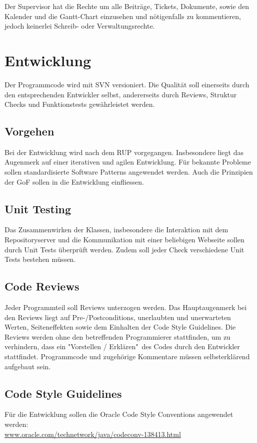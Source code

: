Der Supervisor hat die Rechte um alle Beiträge, Tickets, Dokumente, sowie den Kalender und die Gantt-Chart einzusehen und nötigenfalls zu kommentieren, jedoch keinerlei Schreib- oder Verwaltungsrechte.

\section{Entwicklung}
Der Programmcode wird mit SVN versioniert. Die Qualität soll einerseits durch den entsprechenden Entwickler selbst, andererseits durch Reviews, Struktur Checks und Funktionstests gewährleistet werden.

\subsection{Vorgehen}
Bei der Entwicklung wird nach dem RUP vorgegangen. Insbesondere liegt das Augenmerk auf einer iterativen und agilen Entwicklung. Für bekannte Probleme sollen standardisierte Software Patterns angewendet werden. Auch die Prinzipien der GoF sollen in die Entwicklung einfliessen.

\subsection{Unit Testing}
Das Zusammenwirken der Klassen, insbesondere die Interaktion mit dem Repositoryserver und die Kommunikation mit einer beliebigen Webseite sollen durch Unit Tests überprüft werden. Zudem soll jeder Check verschiedene Unit Tests bestehen müssen.

\subsection{Code Reviews}
Jeder Programmteil soll Reviews unterzogen werden. Das Hauptaugenmerk bei den Reviews liegt auf Pre-/Postconditions, unerlaubten und unerwarteten Werten, Seiteneffekten sowie dem Einhalten der Code Style Guidelines.
Die Reviews werden ohne den betreffenden Programmierer stattfinden, um zu verhindern, dass ein "Vorstellen / Erklären"\ des Codes durch den Entwickler stattfindet. Programmcode und zugehörige Kommentare müssen selbsterklärend aufgebaut sein.

\subsection{Code Style Guidelines}
Für die Entwicklung sollen die Oracle Code Style Conventions angewendet werden: \\ \href{http://www.oracle.com/technetwork/java/codeconv-138413.html}{www.oracle.com/technetwork/java/codeconv-138413.html}

